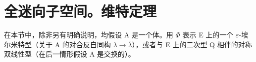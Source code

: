 \section{全迷向子空间。维特定理}

在本节中，除非另有明确说明，均假设 A 是一个体。用 \(\Phi\) 表示 E 上的一个 \(\varepsilon\)-埃尔米特型（关于 A 的对合反自同构 \(\lambda \to \overline{\lambda}\)），或者与 E 上的二次型 Q 相伴的对称双线性型（在后一情形假设 A 是交换的）。


